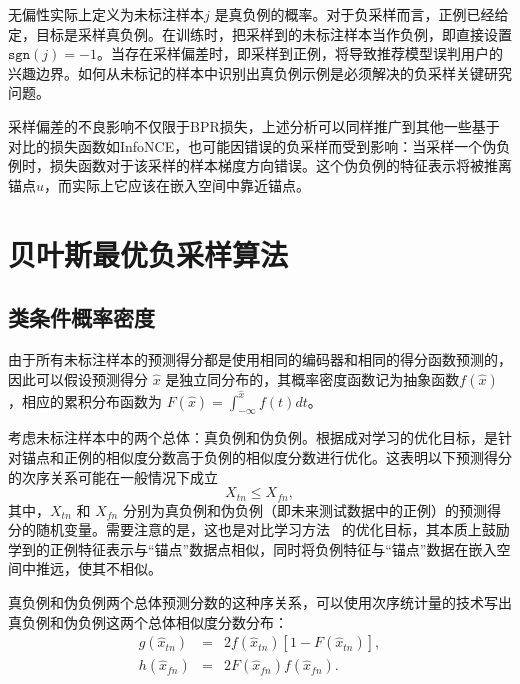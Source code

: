 无偏性实际上定义为未标注样本$j$ 是真负例的概率。对于负采样而言，正例已经给定，目标是采样真负例。在训练时，把采样到的未标注样本当作负例，即直接设置 $\mathtt{sgn}(j)=-1$。当存在采样偏差时，即采样到正例，将导致推荐模型误判用户的兴趣边界。如何从未标记的样本中识别出真负例示例是必须解决的负采样关键研究问题。

采样偏差的不良影响不仅限于BPR损失，上述分析可以同样推广到其他一些基于对比的损失函数如InfoNCE，也可能因错误的负采样而受到影响：当采样一个伪负例时，损失函数对于该采样的样本梯度方向错误。这个伪负例的特征表示将被推离锚点$u$，而实际上它应该在嵌入空间中靠近锚点。

\section{贝叶斯最优负采样算法}
\subsection{类条件概率密度} \label{Sec:Dis}
由于所有未标注样本的预测得分都是使用相同的编码器和相同的得分函数预测的，因此可以假设预测得分 $\hat{x}$ 是独立同分布的，其概率密度函数记为抽象函数$f(\hat{x})$，相应的累积分布函数为 $F(\hat{x}) =\int_{- \infty }^{\hat{x}} f(t)dt$。

考虑未标注样本中的两个总体：真负例和伪负例。根据成对学习的优化目标，是针对锚点和正例的相似度分数高于负例的相似度分数进行优化。这表明以下预测得分的次序关系可能在一般情况下成立
\begin{equation}\label{Eq:OrderRelation}
	X_{tn} \leq X_{fn},
\end{equation}
其中，$X_{tn}$ 和 $X_{fn}$ 分别为真负例和伪负例（即未来测试数据中的正例）的预测得分的随机变量。需要注意的是，这也是对比学习方法~\cite{gutmann:2012:JMLR,Oord:2018:arxiv,Gutmann:2010:ICAIS} 的优化目标，其本质上鼓励学到的正例特征表示与“锚点”数据点相似，同时将负例特征与“锚点”数据在嵌入空间中推远，使其不相似\cite{Wang:2020:ICML,Xu:2022:arxiv,Liu:2021:TKDE}。

真负例和伪负例两个总体预测分数的这种序关系，可以使用次序统计量的技术写出真负例和伪负例这两个总体相似度分数分布：
\begin{eqnarray}\label{Eq:TNpdf}
g(\hat{x}_{tn}) &=& 2 f(\hat{x}_{tn}) [1 - F(\hat{x}_{tn})],\\
h(\hat{x}_{fn}) &=& 2 F(\hat{x}_{fn}) f(\hat{x}_{fn}).	
\end{eqnarray}

